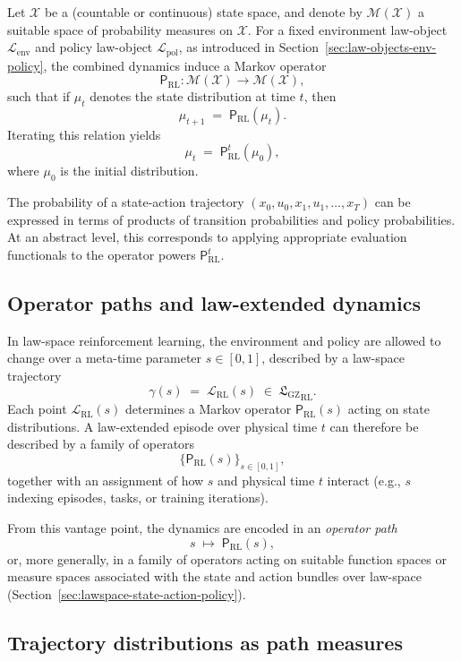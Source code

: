 \documentclass[11pt]{book}
\newcommand{\GZLS}{\ensuremath{\mathfrak{L}_{\mathrm{GZ}}}}
\theoremstyle{plain}
\theoremstyle{definition}
\theoremstyle{remark}
\begin{document}
Let $\mathcal{X}$ be a (countable or continuous) state space, and
denote by $\mathcal{M}(\mathcal{X})$ a suitable space of probability
measures on $\mathcal{X}$. For a fixed environment law-object
$\mathcal{L}_{\mathrm{env}}$ and policy law-object
$\mathcal{L}_{\mathrm{pol}}$, as introduced in
Section~\ref{sec:law-objects-env-policy}, the combined dynamics
induce a Markov operator
\[
   \mathsf{P}_{\mathrm{RL}} \colon \mathcal{M}(\mathcal{X})
   \longrightarrow \mathcal{M}(\mathcal{X}),
\]
such that if $\mu_t$ denotes the state distribution at time $t$,
then
\[
   \mu_{t+1} \;=\; \mathsf{P}_{\mathrm{RL}}(\mu_t).
\]
Iterating this relation yields
\[
   \mu_{t} \;=\; \mathsf{P}_{\mathrm{RL}}^t(\mu_0),
\]
where $\mu_0$ is the initial distribution.

The probability of a state-action trajectory
$(x_0,u_0,x_1,u_1,\dots,x_T)$ can be expressed in terms of products
of transition probabilities and policy probabilities. At an
abstract level, this corresponds to applying appropriate evaluation
functionals to the operator powers $\mathsf{P}_{\mathrm{RL}}^t$.

\subsection*{Operator paths and law-extended dynamics}

In law-space reinforcement learning, the environment and policy are
allowed to change over a meta-time parameter $s\in[0,1]$, described
by a law-space trajectory
\[
   \gamma(s)
   \;=\;
   \mathcal{L}_{\mathrm{RL}}(s)
   \;\in\; {\GZLS}_{\mathrm{RL}}.
\]
Each point $\mathcal{L}_{\mathrm{RL}}(s)$ determines a Markov
operator $\mathsf{P}_{\mathrm{RL}}(s)$ acting on state
distributions. A law-extended episode over physical time $t$ can
therefore be described by a family of operators
\[
   \bigl\{\mathsf{P}_{\mathrm{RL}}(s)\bigr\}_{s\in[0,1]},
\]
together with an assignment of how $s$ and physical time $t$
interact (e.g., $s$ indexing episodes, tasks, or training
iterations).

From this vantage point, the dynamics are encoded in an
\emph{operator path}
\[
   s \;\longmapsto\; \mathsf{P}_{\mathrm{RL}}(s),
\]
or, more generally, in a family of operators acting on suitable
function spaces or measure spaces associated with the state and
action bundles over law-space (Section~\ref{sec:lawspace-state-action-policy}).

\subsection*{Trajectory distributions as path measures}
\end{document}
